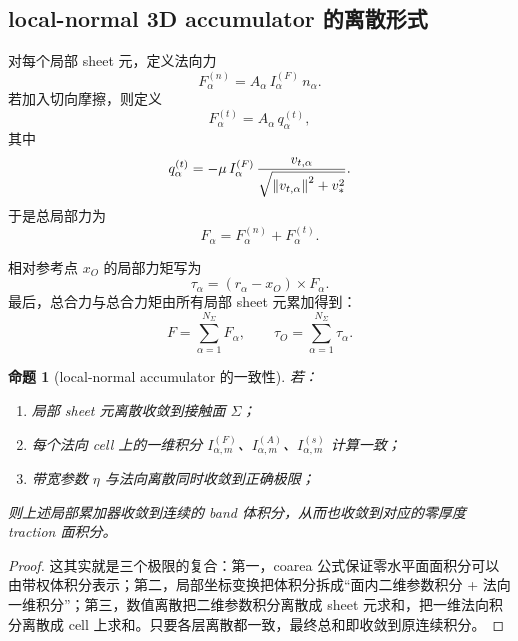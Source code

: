 \documentclass[12pt,a4paper]{ctexart}
\newtheorem{proposition}{命题}
\begin{document}
\subsection{local-normal 3D accumulator 的离散形式}

对每个局部 sheet 元，定义法向力
\begin{equation}
    F_\alpha^{(n)}=A_\alpha\,I_\alpha^{(F)}\,n_\alpha.
\end{equation}
若加入切向摩擦，则定义
\begin{equation}
    F_\alpha^{(t)}=A_\alpha\,q_\alpha^{(t)},
\end{equation}
其中
\begin{equation}
    q_\alpha^{(t)}=
    -\mu\,I_\alpha^{(F)}\,
    \frac{v_{t,\alpha}}{\sqrt{\norm{v_{t,\alpha}}^2+v_*^2}}.
\end{equation}
于是总局部力为
\begin{equation}
    F_\alpha = F_\alpha^{(n)}+F_\alpha^{(t)}.
\end{equation}

相对参考点 $x_O$ 的局部力矩写为
\begin{equation}
    \tau_\alpha = (r_\alpha-x_O)\times F_\alpha.
\end{equation}
最后，总合力与总合力矩由所有局部 sheet 元累加得到：
\begin{equation}
    F=\sum_{\alpha=1}^{N_\Sigma}F_\alpha,
    \qquad
    \tau_O=\sum_{\alpha=1}^{N_\Sigma}\tau_\alpha.
\end{equation}

\begin{proposition}[local-normal accumulator 的一致性]
若：
\begin{enumerate}
    \item 局部 sheet 元离散收敛到接触面 $\Sigma$；
    \item 每个法向 cell 上的一维积分 $I_{\alpha,m}^{(F)}$、$I_{\alpha,m}^{(A)}$、$I_{\alpha,m}^{(s)}$ 计算一致；
    \item 带宽参数 $\eta$ 与法向离散同时收敛到正确极限；
\end{enumerate}
则上述局部累加器收敛到连续的 band 体积分，从而也收敛到对应的零厚度 traction 面积分。
\end{proposition}

\begin{proof}
这其实就是三个极限的复合：第一，coarea 公式保证零水平面面积分可以由带权体积分表示；第二，局部坐标变换把体积分拆成“面内二维参数积分 + 法向一维积分”；第三，数值离散把二维参数积分离散成 sheet 元求和，把一维法向积分离散成 cell 上求和。只要各层离散都一致，最终总和即收敛到原连续积分。
\end{proof}
\end{document}
